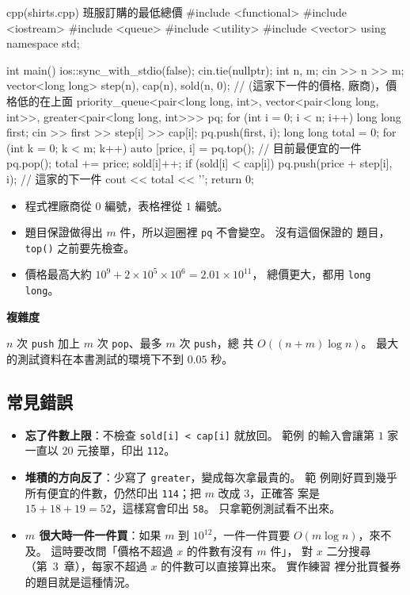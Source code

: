 \begin{example}[label=ex:shirts]{cpp}{(shirts.cpp) 班服訂購的最低總價}
#include <functional>
#include <iostream>
#include <queue>
#include <utility>
#include <vector>
using namespace std;

int main() {
    ios::sync_with_stdio(false);
    cin.tie(nullptr);
    int n, m;
    cin >> n >> m;
    vector<long long> step(n), cap(n), sold(n, 0);
    // (這家下一件的價格, 廠商)，價格低的在上面
    priority_queue<pair<long long, int>, vector<pair<long long, int>>,
                   greater<pair<long long, int>>> pq;
    for (int i = 0; i < n; i++) {
        long long first;
        cin >> first >> step[i] >> cap[i];
        pq.push({first, i});
    }
    long long total = 0;
    for (int k = 0; k < m; k++) {
        auto [price, i] = pq.top();      // 目前最便宜的一件
        pq.pop();
        total += price;
        sold[i]++;
        if (sold[i] < cap[i]) {
            pq.push({price + step[i], i}); // 這家的下一件
        }
    }
    cout << total << '\n';
    return 0;
}
\end{example}


\begin{itemize}
\item 程式裡廠商從 $0$ 編號，表格裡從 $1$ 編號。
\item 題目保證做得出 $m$ 件，所以迴圈裡 \texttt{pq} 不會變空。 沒有這個保證的
題目，\texttt{top()} 之前要先檢查。
\item 價格最高大約 $10^9 + 2 \times 10^5 \times 10^6 = 2.01 \times 10^{11}$，
總價更大，都用 \texttt{long long}。
\end{itemize}

\textbf{複雜度}

$n$ 次 \texttt{push} 加上 $m$ 次 \texttt{pop}、最多 $m$ 次 \texttt{push}，總
共 $O((n + m) \log n)$。 最大的測試資料在本書測試的環境下不到 $0.05$ 秒。

\subsection{常見錯誤}

\begin{itemize}
\item \textbf{忘了件數上限}：不檢查 \texttt{sold[i] < cap[i]} 就放回。 範例
的輸入會讓第 $1$ 家一直以 $20$ 元接單，印出 \texttt{112}。
\item \textbf{堆積的方向反了}：少寫了 \texttt{greater}，變成每次拿最貴的。 範
例剛好買到幾乎所有便宜的件數，仍然印出 \texttt{114}；把 $m$ 改成 $3$，正確答
案是 $15 + 18 + 19 = 52$，這樣寫會印出 \texttt{58}。 只拿範例測試看不出來。
\item \textbf{$m$ 很大時一件一件買}：如果 $m$ 到 $10^{12}$，一件一件買要
$O(m \log n)$，來不及。 這時要改問「價格不超過 $x$ 的件數有沒有 $m$ 件」，
對 $x$ 二分搜尋（第~3~章），每家不超過 $x$ 的件數可以直接算出來。 實作練習
裡分批買餐券的題目就是這種情況。
\end{itemize}

